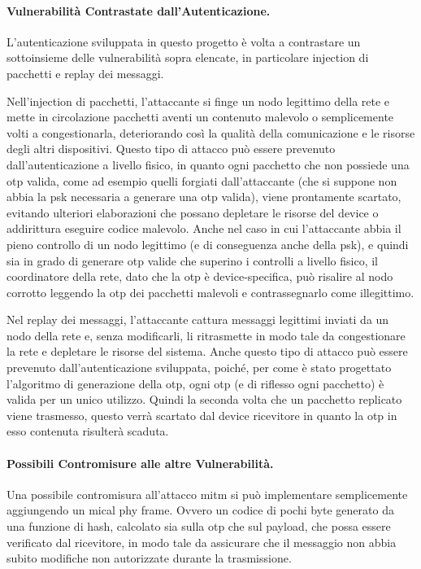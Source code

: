 \paragraph{Vulnerabilità Contrastate dall'Autenticazione.}

L'autenticazione sviluppata in questo progetto è volta a contrastare un sottoinsieme delle vulnerabilità sopra elencate, in particolare injection di pacchetti e replay dei messaggi.

Nell'injection di pacchetti, l'attaccante si finge un nodo legittimo della rete e mette in circolazione pacchetti aventi un contenuto malevolo o semplicemente volti a congestionarla, deteriorando così la qualità della comunicazione e le risorse degli altri dispositivi. Questo tipo di attacco può essere prevenuto dall'autenticazione a livello fisico, in quanto ogni pacchetto che non possiede una \gls{otp} valida, come ad esempio quelli forgiati dall'attaccante (che si suppone non abbia la \gls{psk} necessaria a generare una \gls{otp} valida), viene prontamente scartato, evitando ulteriori elaborazioni che possano depletare le risorse del device o addirittura eseguire codice malevolo. Anche nel caso in cui l'attaccante abbia il pieno controllo di un nodo legittimo (e di conseguenza anche della \gls{psk}), e quindi sia in grado di generare \gls{otp} valide che superino i controlli a livello fisico, il coordinatore della rete, dato che la \gls{otp} è device-specifica, può risalire al nodo corrotto leggendo la \gls{otp} dei pacchetti malevoli e contrassegnarlo come illegittimo.

Nel replay dei messaggi, l'attaccante cattura messaggi legittimi inviati da un nodo della rete e, senza modificarli, li ritrasmette in modo tale da congestionare la rete e depletare le risorse del sistema. Anche questo tipo di attacco può essere prevenuto dall'autenticazione sviluppata, poiché, per come è stato progettato l'algoritmo di generazione della \gls{otp}, ogni \gls{otp} (e di riflesso ogni pacchetto) è valida per un unico utilizzo. Quindi la seconda volta che un pacchetto replicato viene trasmesso, questo verrà scartato dal device ricevitore in quanto la \gls{otp} in esso contenuta risulterà scaduta.


\paragraph{Possibili Contromisure alle altre Vulnerabilità.}
Una possibile contromisura all'attacco \gls{mitm} si può implementare semplicemente aggiungendo un \gls{mic}\glsfirstoccur al \gls{phy} frame. Ovvero un codice di pochi byte generato da una funzione di hash, calcolato sia sulla \gls{otp} che sul payload, che possa essere verificato dal ricevitore, in modo tale da assicurare che il messaggio non abbia subito modifiche non autorizzate durante la trasmissione.

